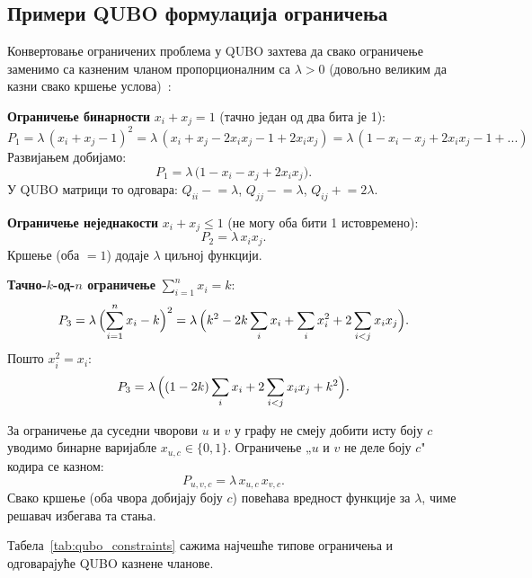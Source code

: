 \subsection{Примери QUBO формулација ограничења}

Конвертовање ограничених проблема у QUBO захтева да свако
ограничење заменимо са казненим чланом пропорционалним са
$\lambda > 0$ (довољно великим да казни свако кршење услова)~\cite{glover2022qubo}:

\textbf{Ограничење бинарности} $x_i + x_j = 1$ (тачно један
од два бита је 1):
\[
  P_1 = \lambda\,(x_i + x_j - 1)^2
      = \lambda\,(x_i + x_j - 2x_ix_j - 1 + 2x_ix_j)
      = \lambda\,(1 - x_i - x_j + 2x_ix_j - 1 + ...)
\]
Развијањем добијамо:
\[
  P_1 = \lambda\,\bigl(1 - x_i - x_j + 2x_ix_j\bigr).
\]
У QUBO матрици то одговара: $Q_{ii} \mathrel{-}= \lambda$,
$Q_{jj} \mathrel{-}= \lambda$, $Q_{ij} \mathrel{+}= 2\lambda$.

\textbf{Ограничење неједнакости} $x_i + x_j \leq 1$
(не могу оба бити 1 истовремено):
\[
  P_2 = \lambda\, x_i x_j.
\]
Кршење (оба $= 1$) додаје $\lambda$ циљној функцији.

\textbf{Тачно-$k$-од-$n$ ограничење} $\sum_{i=1}^n x_i = k$:
\[
  P_3 = \lambda\,\Bigl(\sum_{i=1}^n x_i - k\Bigr)^2
      = \lambda\,\Bigl(k^2 - 2k\sum_i x_i + \sum_i x_i^2 + 2\sum_{i<j}x_ix_j\Bigr).
\]
Пошто $x_i^2 = x_i$:
\[
  P_3 = \lambda\,\Bigl((1-2k)\sum_i x_i + 2\sum_{i<j}x_ix_j + k^2\Bigr).
\]

\begin{example}
За ограничење да суседни чворови $u$ и $v$ у графу не смеју
добити исту боју $c$ уводимо бинарне варијабле $x_{u,c} \in \{0,1\}$.
Ограничење „$u$ и $v$ не деле боју $c$" кодира се казном:
\[
  P_{u,v,c} = \lambda\, x_{u,c}\, x_{v,c}.
\]
Свако кршење (оба чвора добијају боју $c$) повећава вредност
функције за $\lambda$, чиме решавач избегава та стања.
\end{example}

Табела~\ref{tab:qubo_constraints} сажима најчешће типове ограничења
и одговарајуће QUBO казнене чланове.

